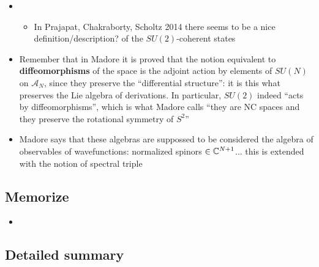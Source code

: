 \documentclass{article}
\begin{document}
\begin{itemize}
\begin{itemize}
        \end{itemize}
    
    \item {}
    
        \begin{itemize}
            
        \item In Prajapat, Chakraborty, Scholtz 2014 there seems to be a nice definition/description? of the $SU(2)$-coherent states
            
        \end{itemize}
    
    \item Remember that in Madore it is proved that the notion equivalent to \textbf{diffeomorphisms} of the space is the adjoint action by elements of $SU(N)$ on $\mathcal A_N$, since they preserve the ``differential structure'': it is this what preserves the Lie algebra of derivations. In particular, $SU(2)$ indeed ``acts by diffeomorphisms'', which is what Madore calls ``they are NC spaces and they preserve the rotational symmetry of $S^2$''
    
    \item Madore says that these algebras are suppossed to be considered the algebra of observables of wavefunctions: normalized spinors $\in \mathbb{C}^{N+1}$... this is extended with the notion of spectral triple
    
    \end{itemize}

\subsection{Memorize}

    \begin{itemize}

    \item 
    
    \end{itemize}

\subsection{Detailed summary}
\end{document}
